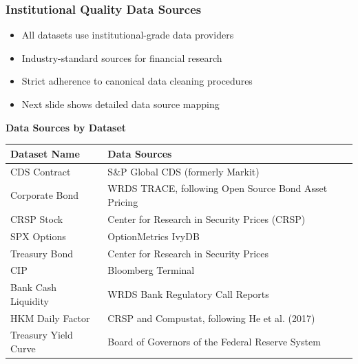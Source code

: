 \documentclass[ignorenonframetext, 9pt]{beamer}
\begin{document}
\begin{frame}
  \frametitle{Institutional Quality Data Sources}
  \begin{itemize}
  \item All datasets use institutional-grade data providers
  \item Industry-standard sources for financial research
  \item Strict adherence to canonical data cleaning procedures
  \item Next slide shows detailed data source mapping
  \end{itemize}
\end{frame}

\begin{frame}[plain]
  \tiny
  \vspace{-0.5cm}
  \centering
  \textbf{Data Sources by Dataset}\\
  \vspace{0.3cm}
  \begin{table}
  \centering
  \begin{tabular}{p{3cm}p{7cm}}
  \toprule
  Dataset Name & Data Sources \\
  \midrule
  CDS Contract & S\&P Global CDS (formerly Markit) \\
  Corporate Bond & WRDS TRACE, following Open Source Bond Asset Pricing \\
  CRSP Stock & Center for Research in Security Prices (CRSP) \\
  SPX Options & OptionMetrics IvyDB \\
  Treasury Bond & Center for Research in Security Prices \\
  CIP & Bloomberg Terminal \\
  Bank Cash Liquidity & WRDS Bank Regulatory Call Reports \\
  HKM Daily Factor & CRSP and Compustat, following He et al. (2017) \\
  Treasury Yield Curve & Board of Governors of the Federal Reserve System \\
  \bottomrule
  \end{tabular}
  \end{table}
\end{frame}
\end{document}
